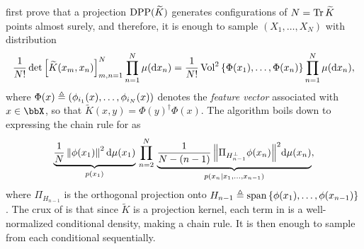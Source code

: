 \documentclass[twoside,11pt]{article}
\begin{document}
          \cite{HKPV06} first prove that a projection $\operatorname{DPP}(\widetilde{K})$ generates configurations of $N=\operatorname{Tr} \widetilde{K}$ points almost surely, and therefore, it is enough to sample $(X_1,\dots,X_N)$ with distribution
          \begin{equation}
          \label{eq:joint_distribution1}
            \frac{1}{N!}
              \det \left[ \widetilde K(x_m,x_n) \right]_{m,n=1}^N
                \prod_{n=1}^N \mu(\mathop{}\!\mathrm{d} x_n)
            = \frac{1}{N!}
                \operatorname{Vol}^2\left\{ \Phi(x_1),\dots,\Phi(x_n) \right\}
                  \prod_{n=1}^N \mu(\mathop{}\!\mathrm{d} x_n),
          \end{equation}
          where $\Phi(x) \triangleq \left( \phi_{i_1}(x),\dots,\phi_{i_N}(x) \right)$ denotes the \emph{feature vector} associated with $x\in\bbX$, so that $\tilde{K}(x,y) = \Phi(y)^{\dagger} \Phi(x)$.
          The algorithm boils down to expressing the chain rule for  as
          \begin{equation}
          \label{eq:joint_distribution2}
            \underbrace{
              \frac{1}{N}
                \left\| \phi(x_1) \right\|^2
                  \mathop{}\!\mathrm{d}\mu(x_1)
              }_{p(x_1)}
            \,\prod_{n=2}^{N}\,
            \underbrace{
              \frac{1}{N-(n-1)}
                \left\|  \Pi_{H_{n-1}^{\perp}} \phi(x_n) \right\|^2\!
                  \mathop{}\!\mathrm{d}\mu(x_n)
              }_{p(x_n\vert x_1,\dots,x_{n-1})},
          \end{equation}
          where $\Pi_{H_{n-1}}$ is the orthogonal projection onto $H_{n-1} \triangleq \operatorname{span}\left\{ \phi(x_1), \dots, \phi(x_{n-1})  \right\}$.
          The crux of \citet[Algorithm 18]{HKPV06} is that since $\tilde K$ is a projection kernel, each term in  is a well-normalized conditional density, making  a chain rule.
          It is then enough to sample from each conditional sequentially.
\end{document}
